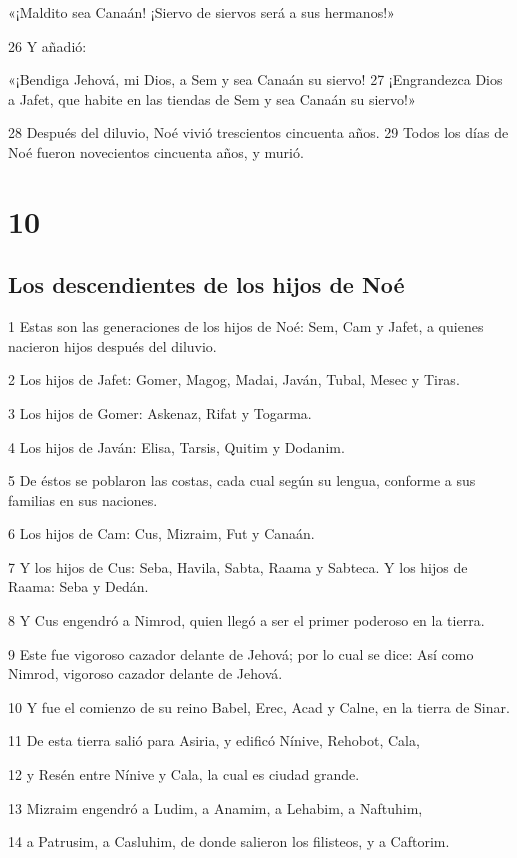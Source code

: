 «¡Maldito sea Canaán!
¡Siervo de siervos será a sus hermanos!»

26 Y añadió:

«¡Bendiga Jehová, mi Dios, a Sem
y sea Canaán su siervo!
27 ¡Engrandezca Dios a Jafet,
que habite en las tiendas de Sem
y sea Canaán su siervo!»

28 Después del diluvio, Noé vivió trescientos cincuenta años. 29 Todos los días de Noé fueron novecientos cincuenta años, y murió.

\chapter{10}

\section{Los descendientes de los hijos de Noé}

1 Estas son las generaciones de los hijos de Noé: Sem, Cam y Jafet, a quienes nacieron hijos después del diluvio.

2 Los hijos de Jafet: Gomer, Magog, Madai, Javán, Tubal, Mesec y Tiras.

3 Los hijos de Gomer: Askenaz, Rifat y Togarma.

4 Los hijos de Javán: Elisa, Tarsis, Quitim y Dodanim.

5 De éstos se poblaron las costas, cada cual según su lengua, conforme a sus familias en sus naciones.

6 Los hijos de Cam: Cus, Mizraim, Fut y Canaán.

7 Y los hijos de Cus: Seba, Havila, Sabta, Raama y Sabteca. Y los hijos de Raama: Seba y Dedán.

8 Y Cus engendró a Nimrod, quien llegó a ser el primer poderoso en la tierra.

9 Este fue vigoroso cazador delante de Jehová; por lo cual se dice: Así como Nimrod, vigoroso cazador delante de Jehová.

10 Y fue el comienzo de su reino Babel, Erec, Acad y Calne, en la tierra de Sinar.

11 De esta tierra salió para Asiria, y edificó Nínive, Rehobot, Cala,

12 y Resén entre Nínive y Cala, la cual es ciudad grande.

13 Mizraim engendró a Ludim, a Anamim, a Lehabim, a Naftuhim,

14 a Patrusim, a Casluhim, de donde salieron los filisteos, y a Caftorim.

